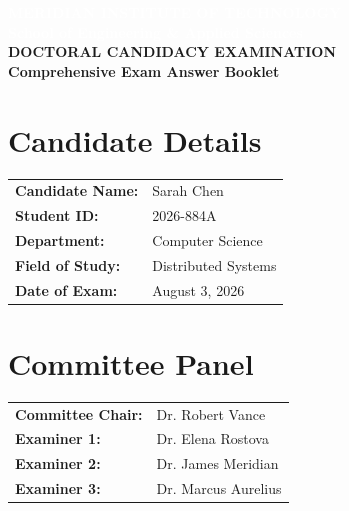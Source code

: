\begin{titlepage}

\vspace*{1.8cm}

\begin{center}
  \textcolor{white}{\sffamily\LARGE\bfseries MERIDIAN INSTITUTE OF TECHNOLOGY}\\[0.2cm]
  \textcolor{white}{\sffamily\large\bfseries School of Engineering \& Applied Sciences}\\[2.5cm]
  
  {\color{primary}\sffamily\Huge\bfseries DOCTORAL CANDIDACY EXAMINATION}\\[0.4cm]
  {\color{secondary}\sffamily\Large\bfseries Comprehensive Exam Answer Booklet}\\[1.5cm]
\end{center}

\vspace*{1.0cm}

\noindent
\begin{minipage}[t]{0.48\textwidth}
  \section*{Candidate Details}
  \begin{tabular}{ll}
    \textbf{Candidate Name:} & Sarah Chen \\
    \textbf{Student ID:}     & 2026-884A \\
    \textbf{Department:}     & Computer Science \\
    \textbf{Field of Study:} & Distributed Systems \\
    \textbf{Date of Exam:}   & August 3, 2026 \\
  \end{tabular}
\end{minipage}
\hfill
\begin{minipage}[t]{0.48\textwidth}
  \section*{Committee Panel}
  \begin{tabular}{ll}
    \textbf{Committee Chair:} & Dr. Robert Vance \\
    \textbf{Examiner 1:}      & Dr. Elena Rostova \\
    \textbf{Examiner 2:}      & Dr. James Meridian \\
    \textbf{Examiner 3:}      & Dr. Marcus Aurelius \\
  \end{tabular}
\end{minipage}


\end{titlepage}
